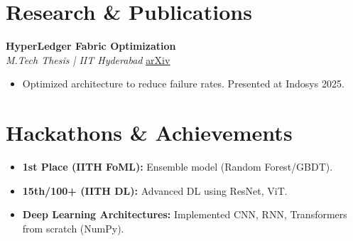 \documentclass[10pt,a4paper]{article}
\newcommand{\resumeItem}[1]{\item\small{#1}}
\begin{document}
\begin{minipage}[t]{0.58\textwidth}
    \section{Research \& Publications}
    \textbf{HyperLedger Fabric Optimization} \\ 
    \textit{M.Tech Thesis | IIT Hyderabad} \hfill \href{https://arxiv.org/}{arXiv} \\
    \vspace{-4pt}
    \begin{itemize}[leftmargin=*, itemsep=1pt, parsep=1pt]
        \resumeItem{Optimized architecture to reduce failure rates. Presented at Indosys 2025.}
    \end{itemize}
    
    \section{Hackathons \& Achievements}
    \begin{itemize}[leftmargin=*, itemsep=1pt, parsep=1pt]
        \resumeItem{\textbf{1st Place (IITH FoML):} Ensemble model (Random Forest/GBDT).}
        \resumeItem{\textbf{15th/100+ (IITH DL):} Advanced DL using ResNet, ViT.}
        \resumeItem{\textbf{Deep Learning Architectures:} Implemented CNN, RNN, Transformers from scratch (NumPy).}
    \end{itemize}

\end{minipage}
\end{document}
